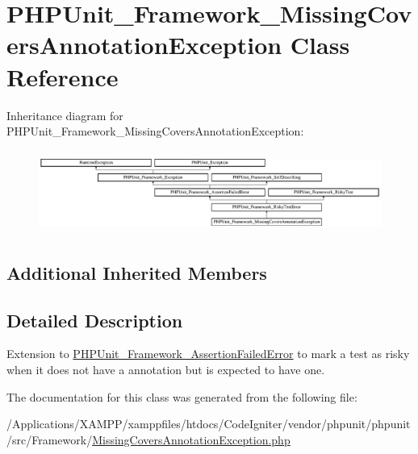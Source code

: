 \hypertarget{class_p_h_p_unit___framework___missing_covers_annotation_exception}{}\section{P\+H\+P\+Unit\+\_\+\+Framework\+\_\+\+Missing\+Covers\+Annotation\+Exception Class Reference}
\label{class_p_h_p_unit___framework___missing_covers_annotation_exception}
Inheritance diagram for P\+H\+P\+Unit\+\_\+\+Framework\+\_\+\+Missing\+Covers\+Annotation\+Exception\+:\begin{figure}[H]
\begin{center}
\leavevmode
\includegraphics[height=2.729045cm]{class_p_h_p_unit___framework___missing_covers_annotation_exception}
\end{center}
\end{figure}
\subsection*{Additional Inherited Members}


\subsection{Detailed Description}
Extension to \mbox{\hyperlink{class_p_h_p_unit___framework___assertion_failed_error}{P\+H\+P\+Unit\+\_\+\+Framework\+\_\+\+Assertion\+Failed\+Error}} to mark a test as risky when it does not have a  annotation but is expected to have one. 

The documentation for this class was generated from the following file\+:\begin{DoxyCompactItemize}
\item 
/\+Applications/\+X\+A\+M\+P\+P/xamppfiles/htdocs/\+Code\+Igniter/vendor/phpunit/phpunit/src/\+Framework/\mbox{\hyperlink{phpunit_2src_2_framework_2_missing_covers_annotation_exception_8php}{Missing\+Covers\+Annotation\+Exception.\+php}}\end{DoxyCompactItemize}
